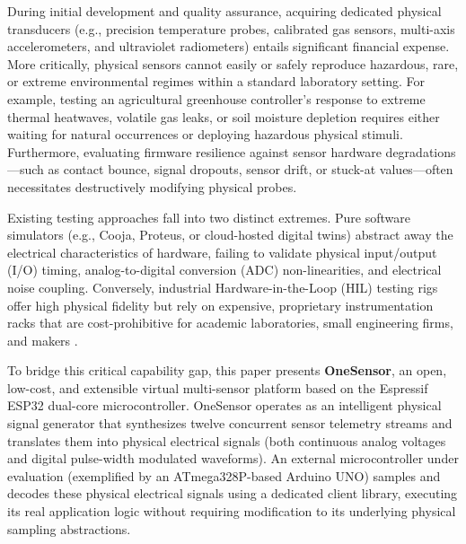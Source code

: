 \documentclass[conference]{IEEEtran}
\begin{document}
During initial development and quality assurance, acquiring dedicated physical transducers (e.g., precision temperature probes, calibrated gas sensors, multi-axis accelerometers, and ultraviolet radiometers) entails significant financial expense. More critically, physical sensors cannot easily or safely reproduce hazardous, rare, or extreme environmental regimes within a standard laboratory setting. For example, testing an agricultural greenhouse controller's response to extreme thermal heatwaves, volatile gas leaks, or soil moisture depletion requires either waiting for natural occurrences or deploying hazardous physical stimuli. Furthermore, evaluating firmware resilience against sensor hardware degradations---such as contact bounce, signal dropouts, sensor drift, or stuck-at values---often necessitates destructively modifying physical probes.

Existing testing approaches fall into two distinct extremes. Pure software simulators (e.g., Cooja, Proteus, or cloud-hosted digital twins) abstract away the electrical characteristics of hardware, failing to validate physical input/output (I/O) timing, analog-to-digital conversion (ADC) non-linearities, and electrical noise coupling. Conversely, industrial Hardware-in-the-Loop (HIL) testing rigs offer high physical fidelity but rely on expensive, proprietary instrumentation racks that are cost-prohibitive for academic laboratories, small engineering firms, and makers \cite{ni_hil_whitepaper, fathy2006review}.

To bridge this critical capability gap, this paper presents \textbf{OneSensor}, an open, low-cost, and extensible virtual multi-sensor platform based on the Espressif ESP32 dual-core microcontroller. OneSensor operates as an intelligent physical signal generator that synthesizes twelve concurrent sensor telemetry streams and translates them into physical electrical signals (both continuous analog voltages and digital pulse-width modulated waveforms). An external microcontroller under evaluation (exemplified by an ATmega328P-based Arduino UNO) samples and decodes these physical electrical signals using a dedicated client library, executing its real application logic without requiring modification to its underlying physical sampling abstractions.
\end{document}
